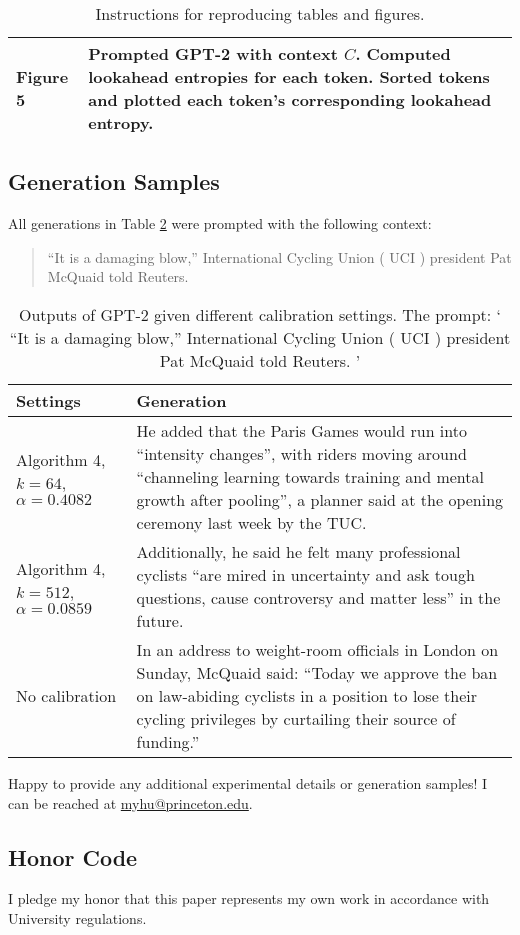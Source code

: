 \documentclass[pageno]{jpaper}
\begin{document}
\begin{table}[ht]
\begin{tabular}[t]{|p{}|p{}|}
    \hline
    Figure 5 & Prompted GPT-2 with context $C$. Computed lookahead entropies for each token. Sorted tokens and plotted each token's corresponding lookahead entropy. \\
    \hline
    \end{tabular}
    \caption{Instructions for reproducing tables and figures.}
    \label{table:reproduce}
\end{table}

\subsection{Generation Samples}

All generations in Table \ref{table:generations} were prompted with the following context:
\begin{quote}
    ``It is a damaging blow,'' International Cycling Union ( UCI ) president Pat McQuaid told Reuters.
\end{quote}
\begin{table}[ht]
    \centering
    \begin{tabular}[t]{|p{}|p{}|}
        \hline 
        Settings & Generation \\
        \hline
        \hline
        Algorithm 4, $k=64$, $\alpha=0.4082$ & He added that the Paris Games would run into ``intensity changes'', with riders moving around ``channeling learning towards training and mental growth after pooling'', a planner said at the opening ceremony last week by the TUC. \\
        \hline
        Algorithm 4, $k=512$, $\alpha=0.0859$ & Additionally, he said he felt many professional cyclists ``are mired in uncertainty and ask tough questions, cause controversy and matter less'' in the future. \\
        \hline
        No calibration & In an address to weight-room officials in London on Sunday, McQuaid said: ``Today we approve the ban on law-abiding cyclists in a position to lose their cycling privileges by curtailing their source of funding.'' \\
        \hline
    \end{tabular}
    \caption{Outputs of GPT-2 given different calibration settings. The prompt: ` ``It is a damaging blow,'' International Cycling Union ( UCI ) president Pat McQuaid told Reuters. '}
    \label{table:generations}
\end{table}


Happy to provide any additional experimental details or generation samples! I can be reached at \href{mailto:myhu@princeton.edu}{myhu@princeton.edu}.

\subsection{Honor Code}

I pledge my honor that this paper represents my own work in accordance with University regulations.
\end{document}
